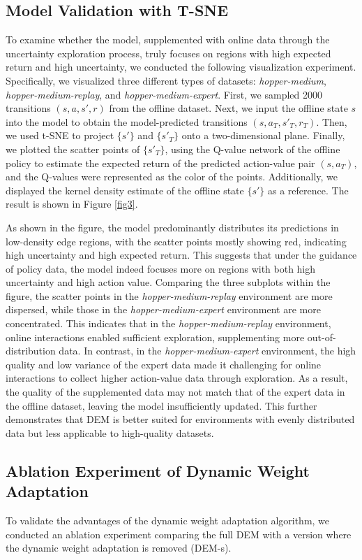 \documentclass[conference]{IEEEtran}
\begin{document}
\subsection{Model Validation with T-SNE}
To examine whether the model, supplemented with online data through the uncertainty exploration process, truly focuses on regions with high expected return and high uncertainty, we conducted the following visualization experiment. Specifically, we visualized three different types of datasets: \textit{hopper-medium}, \textit{hopper-medium-replay}, and \textit{hopper-medium-expert}. First, we sampled 2000 transitions $(s, a, s', r)$ from the offline dataset. Next, we input the offline state $s$ into the model to obtain the model-predicted transitions $(s, a_T, s'_T, r_T)$. Then, we used t-SNE \cite{tsne} to project $\{s'\}$ and $\{s'_T\}$ onto a two-dimensional plane. Finally, we plotted the scatter points of $\{s'_T\}$, using the Q-value network of the offline policy to estimate the expected return of the predicted action-value pair $(s, a_T)$, and the Q-values were represented as the color of the points. Additionally, we displayed the kernel density estimate of the offline state $\{s'\}$ as a reference. The result is shown in Figure \ref{fig3}.

As shown in the figure, the model predominantly distributes its predictions in low-density edge regions, with the scatter points mostly showing red, indicating high uncertainty and high expected return. This suggests that under the guidance of policy data, the model indeed focuses more on regions with both high uncertainty and high action value. Comparing the three subplots within the figure, the scatter points in the \textit{hopper-medium-replay} environment are more dispersed, while those in the \textit{hopper-medium-expert} environment are more concentrated. This indicates that in the \textit{hopper-medium-replay} environment, online interactions enabled sufficient exploration, supplementing more out-of-distribution data. In contrast, in the \textit{hopper-medium-expert} environment, the high quality and low variance of the expert data made it challenging for online interactions to collect higher action-value data through exploration. As a result, the quality of the supplemented data may not match that of the expert data in the offline dataset, leaving the model insufficiently updated. This further demonstrates that DEM is better suited for environments with evenly distributed data but less applicable to high-quality datasets.

\subsection{Ablation Experiment of Dynamic Weight Adaptation}
To validate the advantages of the dynamic weight adaptation algorithm, we conducted an ablation experiment comparing the full DEM with a version where the dynamic weight adaptation is removed (DEM-s).
\end{document}
